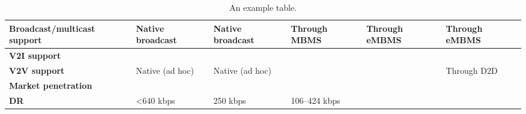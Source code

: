 \begin{table}[h!]
\begin{tabulary}{\columnwidth}{L|L|L|L|L|L}
	\bf{Broadcast/multicast support} & Native broadcast                                      & Native broadcast                                      & Through MBMS                     & Through eMBMS            & Through eMBMS             \\\hline
	\bf{V2I support}                 & \ok                                                   & \ok                                                   & \ok                              & \ok                      & \ok                       \\\hline
	\bf{V2V support}                 & Native (ad hoc)                                       & Native (ad hoc)                                       & \ko                              & \ko                      & Through D2D               \\\hline
	\bf{Market penetration}          & \ok                                                   & \ko                                                   & \ok                              & \ok                      & \ok                       \\\hline
	\bf{\ac{DR}}                   & <640 kbps                                        & 250 kbps                                              & 106–424 kbps                              & \ok                      & \ok                       \\\hline
	\end{tabulary}
	\caption{\label{tab:Tableppp} An example table.}
\end{table}



\clearpage
\newpage


